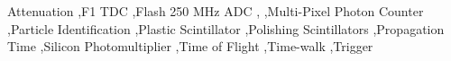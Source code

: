 \begin{keyword}
Attenuation \sep F1 TDC \sep Flash 250 MHz ADC \sep \gx{} \sep Multi-Pixel Photon Counter \sep Particle Identification \sep Plastic Scintillator \sep Polishing Scintillators \sep Propagation Time \sep Silicon Photomultiplier \sep Time of Flight \sep Time-walk \sep Trigger
\end{keyword}